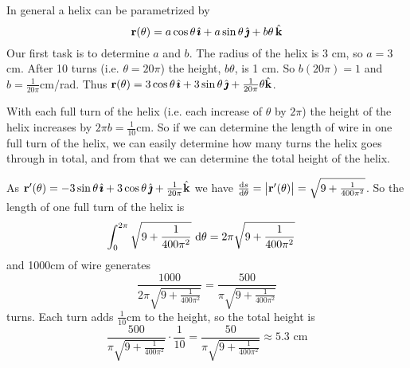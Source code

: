 \begin{solution}
In general a helix can be parametrized by
\begin{equation*}
\mathbf{r}(\theta)=a\cos\theta\,\hat{\pmb{\imath}}+a\sin\theta\,\hat{\pmb{\jmath}}+b\theta\,\hat{\mathbf{k}}
\end{equation*}
Our first task is to determine $a$ and $b$.
The radius of the helix is $3$ cm, so $a=3$ cm. 
After 10 turns (i.e. $\theta=20\pi$) the height, $b\theta$,
is 1 cm. So $b(20\pi)=1$ and $b=\frac{1}{20\pi}$cm/rad. 
Thus 
$\mathbf{r}(\theta)=3\cos\theta\,\hat{\pmb{\imath}}+3\sin\theta\,\hat{\pmb{\jmath}}+\frac{1}{20\pi}\theta\hat{\mathbf{k}}$.

With each full turn of the helix (i.e. each increase of $\theta$ by $2\pi$)
the height of the helix increases by $2\pi b=\frac{1}{10}\textrm{cm}$.
So if we can determine the length of wire in one full turn of the helix, 
we can easily determine how many turns the helix goes through in total,
and from that we can determine the total height of the helix.

As $\mathbf{r}'(\theta)=-3\sin\theta\,\hat{\pmb{\imath}}+3\cos\theta\,\hat{\pmb{\jmath}}+\frac{1}{20\pi}\hat{\mathbf{k}}$
we have $\diff{s}{\theta}=\big|\vr'(\theta)\big|=\sqrt{9+\frac{1}{400\pi^2}}$.
So the length of one full turn of the helix is
\begin{align*}
\int_0^{2\pi}\sqrt{9+\frac{1}{400\pi^2}}\ \mathrm{d}\theta
&=2\pi\sqrt{9+\frac{1}{400\pi^2}}
\end{align*}
and 1000cm of wire generates
\begin{equation*}
\frac{1000}{2\pi\sqrt{9+\frac{1}{400\pi^2}}}
=\frac{500}{\pi\sqrt{9+\frac{1}{400\pi^2}}}
\end{equation*}
turns. Each turn adds $\frac{1}{10}\textrm{cm}$ to the height, so the total height is
\begin{equation*}
\frac{500}{\pi\sqrt{9+\frac{1}{400\pi^2}}}\cdot \frac{1}{10}
=\frac{50}{\pi\sqrt{9+\frac{1}{400\pi^2}}}
\approx 5.3\textrm{ cm}
\end{equation*}


\end{solution}
